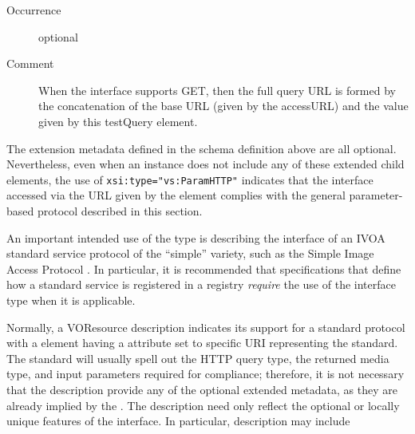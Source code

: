 \documentclass[11pt,a4paper]{ivoa}
\begin{document}
\begin{generated}
\begin{bigdescription}
\begin{description}
\item[Occurrence] optional
\item[Comment]
                       When the interface supports GET, then the full
                       query URL is formed by the concatenation of the
                       base URL (given by the accessURL) and the value
                       given by this testQuery element.


\end{description}


\end{bigdescription}\endgroup

\endgroup
\end{generated}


The extension metadata defined in the schema definition above are all
optional.  Nevertheless, even when an 
instance does not include any of these extended child elements, the
use of \verb|xsi:type="vs:ParamHTTP"| indicates that the interface
accessed via the URL given by the 
element complies with the general parameter-based protocol described
in this section.







An important intended use of the  type is
describing the interface of an IVOA standard service protocol
of the ``simple'' variety, such as the Simple Image Access Protocol
\citep{2015ivoa.spec.1223D}.  In particular, it is recommended that
specifications that define how a standard service is registered in a
registry \emph{require} the use of the 
interface type when it is applicable.



Normally, a VOResource
description indicates its support for a standard protocol with a
 element having a
 attribute set to specific URI representing the
standard.  The standard will usually spell out the HTTP query type,
the returned media type, and input parameters required for compliance;
therefore, it is not necessary that the 
description provide any of the optional extended metadata, as they are
already implied by the .  The description need
only reflect the optional or locally unique features of the
interface.  In particular, description may include
\end{document}
